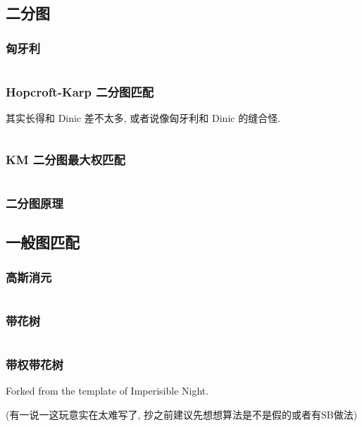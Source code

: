 \documentclass[a4paper, twoside]{article}
\begin{document}
\begin{multicols}{2}
			\subsection{二分图}
				\subsubsection{匈牙利}
					\inputminted{cpp}{../src/graph/hungary.cpp}

				\subsubsection{Hopcroft-Karp 二分图匹配}
					其实长得和 Dinic 差不太多, 或者说像匈牙利和 Dinic 的缝合怪.
					\inputminted{cpp}{../src/graph/hopcroft-karp.cpp}

				\subsubsection{KM 二分图最大权匹配}
					\inputminted{cpp}{../src/graph/KM二分图最大权匹配.cpp}

				\subsubsection{二分图原理}
					
			
			\subsection{一般图匹配}
				\subsubsection{高斯消元}
					\inputminted{cpp}{../src/graph/基于线性代数的一般图匹配.cpp}

				\subsubsection{带花树}
					\inputminted{cpp}{../src/graph/带花树.cpp}
				
				\subsubsection{带权带花树}
					Forked from the template of Imperisible Night.

					(有一说一这玩意实在太难写了, 抄之前建议先想想算法是不是假的或者有SB做法)
					\inputminted{cpp}{../src/graph/带权带花树.cpp}
				

\end{multicols}
\end{document}
